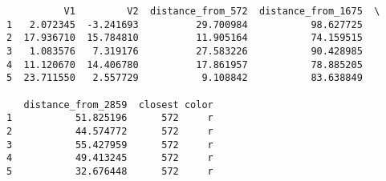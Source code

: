 \documentclass[11pt]{article}
\begin{document}
    
    \begin{verbatim}
          V1         V2  distance_from_572  distance_from_1675  \
1   2.072345  -3.241693          29.700984           98.627725   
2  17.936710  15.784810          11.905164           74.159515   
3   1.083576   7.319176          27.583226           90.428985   
4  11.120670  14.406780          17.861957           78.885205   
5  23.711550   2.557729           9.108842           83.638849   

   distance_from_2859  closest color  
1           51.825196      572     r  
2           44.574772      572     r  
3           55.427959      572     r  
4           49.413245      572     r  
5           32.676448      572     r  
    \end{verbatim}

    
    \begin{center}
    \end{center}
    { \hspace*{\fill} \\}
    
\end{document}
